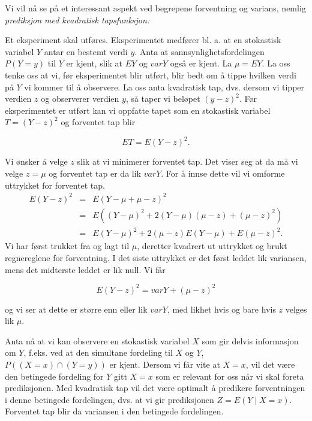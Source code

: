 Vi vil nå se på et interessant aspekt ved begrepene forventning
og varians, nemlig {\em prediksjon med kvadratisk tapsfunksjon:}


Et eksperiment skal utføres. Eksperimentet medfører bl. a. at en
stokastisk variabel $Y$ antar en bestemt verdi $y$. Anta at
sannsynlighetsfordelingen $P(Y=y)$ til $Y$ er kjent, slik at $EY$
og $varY$ også er kjent. La $\mu =EY$. La oss tenke oss at vi,
før eksperimentet blir utført, blir bedt om å tippe hvilken verdi
på $Y$ vi kommer til å observere. La oss anta kvadratisk tap,
dvs. dersom vi tipper verdien $z$ og observerer verdien $y$, så
taper vi beløpet $(y-z)^2$. Før eksperimentet er utført kan vi
oppfatte tapet som en stokastisk variabel $T=(Y-z)^2$ og
forventet tap blir

\[ ET=E(Y-z)^2. \]

\noindent Vi ønsker å velge $z$ slik at vi minimerer forventet tap. Det
viser seg at da må vi velge $z=\mu$ og forventet tap er da lik
$varY$. For å innse dette vil vi omforme uttrykket for forventet
tap.
\begin{eqnarray*}
     E(Y-z)^2&=&E(Y-\mu +\mu -z)^2 \\
             &=&E((Y-\mu )^2+2(Y-\mu )(\mu -z)+(\mu -z)^2) \\
             &=&E(Y-\mu )^2+2(\mu -z)E(Y-\mu )+E(\mu -z)^2.
\end{eqnarray*}
\noindent Vi har først trukket fra og lagt til $\mu$, deretter kvadrert ut
uttrykket og brukt regnereglene for forventning. I det siste
uttrykket er det først leddet lik variansen, mens det midterste
leddet er lik null. Vi får

\[ E(Y-z)^2=varY+(\mu -z)^2\]

\noindent og vi ser at dette er større enn eller lik $varY$, med likhet
hvis og bare hvis $z$ velges lik $\mu$.

Anta nå at vi kan observere en stokastisk variabel $X$ som gir
delvis informasjon om $Y$, f.eks. ved at den simultane
fordeling til $X$ og $Y$, $P((X=x)\cap (Y=y))$ er kjent. Dersom vi
får vite at $X=x$, vil det være den betingede fordeling for $Y$
gitt $X=x$ som er relevant for oss når vi skal foreta
prediksjonen. Med kvadratisk tap vil det være optimalt å
predikere forventningen i denne betingede fordelingen, dvs. at vi
gir prediksjonen $Z=E(Y\mid X=x)$. Forventet tap blir da
variansen i den betingede fordelingen. \\


